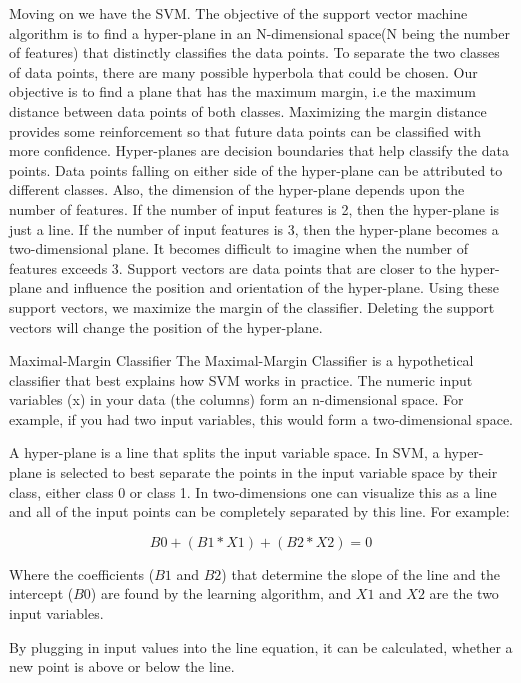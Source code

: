 \documentclass[12pt]{article}
\begin{document}
Moving on we have the SVM. The objective of the support vector machine algorithm is to find a hyper-plane in an N-dimensional space(N being the number of features) that distinctly classifies the data points. To separate the two classes of data points, there are many possible hyperbola that could be chosen. Our objective is to find a plane that has the maximum margin, i.e the maximum distance between data points of both classes. Maximizing the margin distance provides some reinforcement so that future data points can be classified with more confidence. Hyper-planes are decision boundaries that help classify the data points. Data points falling on either side of the hyper-plane can be attributed to different classes. Also, the dimension of the hyper-plane depends upon the number of features. If the number of input features is 2, then the hyper-plane is just a line. If the number of input features is 3, then the hyper-plane becomes a two-dimensional plane. It becomes difficult to imagine when the number of features exceeds 3. Support vectors are data points that are closer to the hyper-plane and influence the position and orientation of the hyper-plane. Using these support vectors, we maximize the margin of the classifier. Deleting the support vectors will change the position of the hyper-plane.

Maximal-Margin Classifier
The Maximal-Margin Classifier is a hypothetical classifier that best explains how SVM works in practice. The numeric input variables (x) in your data (the columns) form an n-dimensional space. For example, if you had two input variables, this would form a two-dimensional space.

A hyper-plane is a line that splits the input variable space. In SVM, a hyper-plane is selected to best separate the points in the input variable space by their class, either class 0 or class 1. In two-dimensions one can visualize this as a line and all of the input points can be completely separated by this line. For example:

$$B0 + (B1 * X1) + (B2 * X2) = 0$$

Where the coefficients ($B1$ and $B2$) that determine the slope of the line and the intercept ($B0$) are found by the learning algorithm, and $X1$ and $X2$ are the two input variables.

By plugging in input values into the line equation, it can be calculated, whether a new point is above or below the line.
\end{document}
